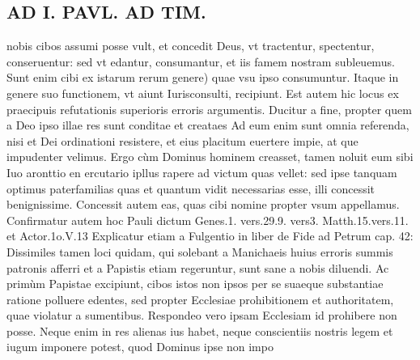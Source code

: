 \documentclass{article}
\begin{document}
\begin{pages}
\section*{AD I. PAVL. AD TIM. }
\marginpar{[ p.192 ]}\pstart nobis cibos assumi posse vult, et concedit Deus, vt tractentur, spectentur, conseruentur: sed vt edantur, consumantur, et iis famem nostram subleuemus. Sunt enim cibi ex istarum rerum genere) quae vsu ipso consumuntur. Itaque in genere suo functionem, vt aiunt Iurisconsulti, recipiunt. Est autem hic locus ex praecipuis refutationis superioris erroris argumentis. Ducitur a fine, propter quem a Deo ipso illae res sunt conditae et creataes Ad eum enim sunt omnia referenda, nisi et Dei ordinationi resistere, et eius placitum euertere impie, at que impudenter velimus. Ergo cùm Dominus hominem creasset, tamen noluit eum sibi Iuo aronttio en ercutario ipllus rapere ad victum quas vellet: sed ipse tanquam optimus paterfamilias quas et quantum vidit necessarias esse, illi concessit benignissime. Concessit autem eas, quas cibi nomine propter vsum appellamus.  \pend\pstart Confirmatur autem hoc Pauli dictum Genes.1. vers.29.9. vers3. Matth.15.vers.11. et Actor.1o.V.13 Explicatur etiam a Fulgentio in liber  de Fide ad Petrum cap. 42:  \pend\pstart Dissimiles tamen loci quidam, qui solebant a Manichaeis huius erroris summis patronis afferri et a Papistis etiam regeruntur, sunt sane a nobis diluendi. Ac primùm Papistae excipiunt, cibos istos non ipsos per se suaeque substantiae ratione polluere edentes, sed propter Ecclesiae prohibitionem et authoritatem, quae violatur a sumentibus. Respondeo vero ipsam Ecclesiam id prohibere non posse. Neque enim in res alienas ius habet, neque conscientiis nostris legem et iugum imponere potest, quod Dominus ipse non impo\pend

\end{pages}
\end{document}
